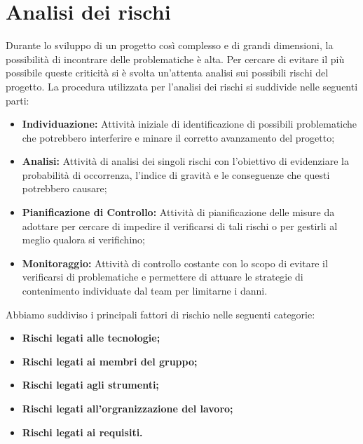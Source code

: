 \section{Analisi dei rischi}
\label{analisi_dei_rischi}
Durante lo sviluppo di un progetto così complesso e di grandi dimensioni, la possibilità di incontrare delle problematiche è alta. Per cercare di evitare il più possibile queste criticità si è svolta un'attenta analisi sui possibili rischi del progetto. La procedura utilizzata per l'analisi dei rischi si suddivide nelle seguenti parti:
\begin{itemize}
    \item \textbf{Individuazione:} Attività iniziale di identificazione di possibili problematiche che potrebbero interferire e minare il corretto avanzamento del progetto;
    \item \textbf{Analisi:} Attività di analisi dei singoli rischi con l'obiettivo di evidenziare la probabilità di occorrenza, l'indice di gravità e le conseguenze che  questi potrebbero causare;
    \item \textbf{Pianificazione di Controllo:} Attività di pianificazione delle misure da adottare per cercare di impedire il verificarsi di tali rischi o per gestirli al meglio qualora si verifichino;
    \item \textbf{Monitoraggio:} Attività di controllo costante con lo scopo di evitare il verificarsi di problematiche e permettere di attuare le strategie di contenimento individuate dal team per limitarne i danni.
\end{itemize}

Abbiamo suddiviso i principali fattori di rischio nelle seguenti categorie:
\begin{itemize}
    \item \textbf{Rischi legati alle tecnologie;}
    \item \textbf{Rischi legati ai membri del gruppo;}
    \item \textbf{Rischi legati agli strumenti;}
    \item \textbf{Rischi legati all'orgranizzazione del lavoro;}
    \item \textbf{Rischi legati ai requisiti.}
\end{itemize}

\renewcommand{\arraystretch}{1.5}

\newpage


\newpage


\newpage


\newpage


\newpage
